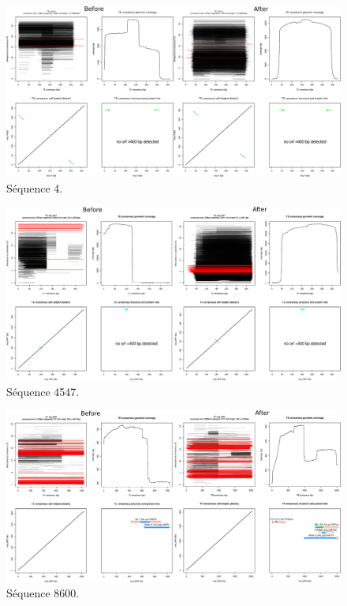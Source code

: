 \documentclass[10pt]{article}
\begin{document}
\begin{figure}[H]
    \centering
    \includegraphics[width=\textwidth]{img/plots/seq_4.eps}
    \caption{Séquence 4.}
    \label{fig:seq_4}
\end{figure}

\begin{figure}[H]
    \centering
    \includegraphics[width=\textwidth]{img/plots/seq_4547.eps}
    \caption{Séquence 4547.}
    \label{fig:seq_4547}
\end{figure}

\begin{figure}[H]
    \centering
    \includegraphics[width=\textwidth]{img/plots/seq_8600.eps}
    \caption{Séquence 8600.}
    \label{fig:seq_8600}
\end{figure}
\end{document}
